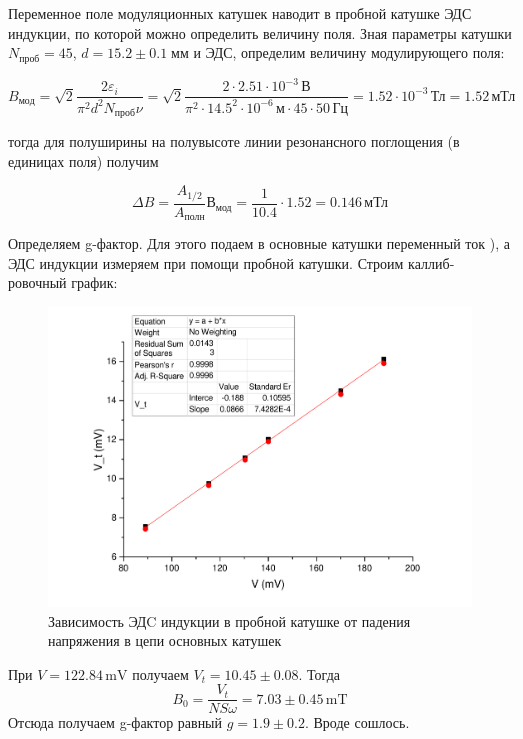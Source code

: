 \documentclass[a4paper,12pt]{article}
\begin{document}
    
    
    Переменное поле модуляционных катушек наводит в пробной катушке ЭДС индукции,
по которой можно определить величину поля. 
Зная параметры катушки $N_{проб} = 45$, $d = 15.2 \pm 0.1 \; мм$ и ЭДС, определим величину модулирующего поля:

\begin{equation}
B_{мод} = \sqrt{2} \frac{2\varepsilon_i}{\pi^2 d^2N_{проб} \nu} = \sqrt{2} \frac{2 \cdot 2.51 \cdot 10^{-3}\, \text{В}}{\pi^2 \cdot 14.5^2 \cdot 10^{-6} \, \text{м} \cdot 45 \cdot 50\, \text{Гц}}  = 1.52 \cdot 10^{-3} \,\text{Тл} = 1.52 \, \text{мТл}
\end{equation}

тогда для полуширины на полувысоте линии резонансного поглощения (в единицах поля) получим

\begin{equation}
\Delta B  = \frac{A_{1/2}}{A_{\text{полн}}} В_{\text{мод}} = \frac{1}{10.4}\cdot 1.52 = 0.146 \,\text{мТл}  
\end{equation}

Определяем g-фактор. Для этого подаем в основные катушки переменный ток 
), а ЭДС индукции измеряем при помощи пробной катушки. Строим каллиб-
ровочный график:

\begin{figure}
    \centering
    \includegraphics[width = 0.8\linewidth]{cal}
    \caption{ Зависимость ЭДC индукции в пробной катушке от падения напряжения в цепи основных катушек}
    \label{fig:my_label}
\end{figure}
    
    При $V = 122.84\,\mathrm{mV}$ получаем $V_t = 10.45\pm0.08$. Тогда
    \begin{equation}
        B_0 = \frac{V_t}{NS\omega} = 7.03\pm 0.45\,\mathrm{mT}
    \end{equation}
    Отсюда получаем g-фактор равный $g = 1.9\pm0.2$. Вроде сошлось.
    
\end{document}
